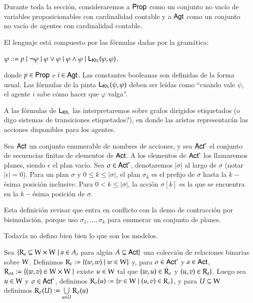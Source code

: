 Durante toda la sección, consideraremos a ${\rm \sf Prop}$ como un conjunto no vacío de variables proposicionables con cardinalidad contable y a ${\rm \sf Agt}$ como un conjunto no vacío de agentes con cardinalidad contable. 

\begin{definicion}
    El lenguaje \KHilogic está compuesto por las fórmulas dadas por la gramática:
    \begin{center}
        $\varphi ::= p \mid \neg \varphi \mid \varphi \vee \varphi \mid \varphi \wedge \varphi \mid \mathsf{L}_{\mathsf{Kh}_i}(\varphi,\varphi)$,
    \end{center}
    donde $p \in {\rm \sf Prop}$ e $i \in {\rm \sf Agt}$. Las constantes booleanas son definidas de la forma usual. Las fórmulas de la pinta $\mathsf{L}_{\mathsf{Kh}_i}(\psi, \varphi)$ deben ser leídas como ``cuando vale $\psi$, el agente $i$ sabe cómo hacer que $\varphi$ valga''.
\end{definicion}

A las fórmulas de $\mathsf{L}_{\mathsf{Kh}_i}$ las interpretaremos sobre grafos dirigidos etiquetados (o digo sistemas de transiciones etiquetados?), en donde las aristas representarán las acciones disponibles para los agentes.

\begin{definicion}
    Sea ${\rm \sf Act}$ un conjunto enumerable de nombres de acciones, y sea ${\rm \sf Act}^*$ el conjunto de secuencias finitas de elementos de ${\rm \sf Act}$. A los elementos de ${\rm \sf Act}^*$ los llamaremos planes, siendo $\epsilon$ el plan vacío. Sea $\sigma \in {\rm \sf Act}^*$, denotaremos $|\sigma|$ al largo de $\sigma$ (notar $|\epsilon| = 0$). Para un plan $\sigma$ y $0 \leq k \leq |\sigma|$, el plan $\sigma_k$ es el prefijo de $\sigma$ hasta la $k-$ésima posición inclusive. Para $0 < k \leq |\sigma|$, la acción $\sigma[k]$ es la que se encuentra en la $k-$ésima posición de $\sigma$.  
\end{definicion}

Esta definición revisar que entra en conflicto con la demo de contracción por bisimulación, porque uso $\sigma_1,...,\sigma_k$ para enumerar un conjunto de planes.

Todavía no defino bien bien lo que son los modelos.

\begin{definicion}
    Sea $\{\mathrm{R}_a \subseteq \mathrm{W} \times \mathrm{W} \mid a \in A,$ para algún $A \subseteq {\rm \sf Act} \}$ una colección de relaciones binarias sobre $\mathrm{W}$. Definimos $\mathrm{R}_\epsilon := \{(w,w) \mid w \in \mathrm{W}\}$ y, para $\sigma \in {\rm \sf Act}^*$ y $a \in {\rm \sf Act}$, $\mathrm{R}_{\sigma a} := \{(w,v) \in \mathrm{W} \times \mathrm{W} \mid$ existe $u \in \mathrm{W}$ tal que $(w,u) \in \mathrm{R}_\sigma$ y $(u,v) \in \mathrm{R}_a \}$. Luego sea $u \in \mathrm{W}$ y $\sigma \in {\rm \sf Act}^*$, definimos $\mathrm{R}_\sigma(u) := \{v\in\mathrm{W} \mid (u,v) \in \mathrm{R}_\sigma\}$, y para $U\subseteq\mathrm{W}$ definimos $\mathrm{R}_\sigma(U) := \bigcup\limits_{u \in U} \mathrm{R}_\sigma(u)$
\end{definicion}
